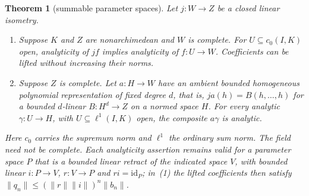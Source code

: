 \documentclass[11pt]{amsart}
\newtheorem{theorem}{Theorem}[section]
\theoremstyle{definition}
\theoremstyle{remark}
\numberwithin{equation}{section}
\newcommand{\id}{\mathrm{id}}
\newcommand{\norm}[1]{\lVert #1\rVert}
\begin{document}
\begin{theorem}[summable parameter spaces]\label{thm:summable-parameters}
Let $j\colon W\to Z$ be a closed linear isometry.
\begin{enumerate}
\item Suppose $K$ and $Z$ are nonarchimedean and $W$ is complete. For $U\subseteq c_0(I,K)$ open, analyticity of $jf$ implies analyticity of $f\colon U\to W$. Coefficients can be lifted without increasing their norms.
\item Suppose $Z$ is complete. Let $a\colon H\to W$ have an ambient bounded homogeneous polynomial representation of fixed degree $d$, that is, $ja(h)=B(h,\ldots,h)$ for a bounded $d$-linear $B\colon H^d\to Z$ on a normed space $H$. For every analytic $\gamma\colon U\to H$, with $U\subseteq\ell^1(I,K)$ open, the composite $a\gamma$ is analytic.
\end{enumerate}
Here $c_0$ carries the supremum norm and $\ell^1$ the ordinary sum norm. The field need not be complete. Each analyticity assertion remains valid for a parameter space $P$ that is a bounded linear retract of the indicated space $V$, with bounded linear $i\colon P\to V$, $r\colon V\to P$ and $ri=\id_P$; in~(1) the lifted coefficients then satisfy $\norm{q_n}\le(\norm r\norm i)^n\norm{b_n}$.
\end{theorem}
\end{document}
